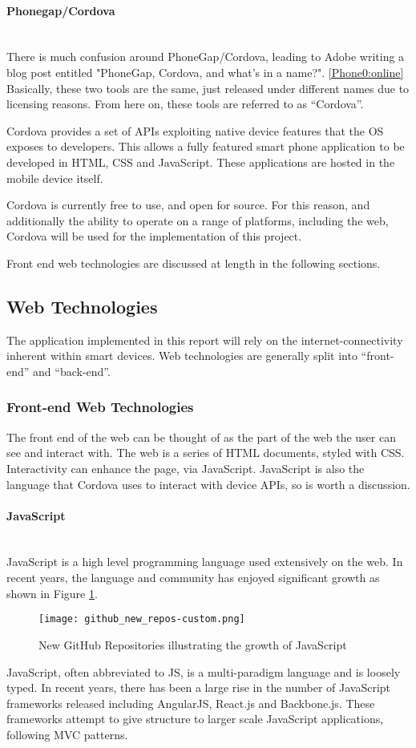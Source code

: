 \documentclass[a4paper]{article}
\newcommand{\subsubsubsection}[1]{\paragraph{#1}\mbox{}\\}
\begin{document}
\subsubsubsection{Phonegap/Cordova} 
There is much confusion around PhoneGap/Cordova, leading to Adobe writing a blog post entitled "PhoneGap, Cordova, and what’s in a name?". \ref{Phone0:online}
Basically, these two tools are the same, just released under different names due to licensing reasons. From here on, these tools are referred to as ``Cordova''. 

Cordova provides a set of APIs exploiting native device features that the OS exposes to developers.
This allows a fully featured smart phone application to be developed in HTML, CSS and JavaScript. These applications are hosted in the mobile device itself.

Cordova is currently free to use, and open for source. For this reason, and additionally the ability to operate on a range of platforms, including the web, Cordova will be used for the implementation of this project.

Front end web technologies are discussed at length in the following sections.

\subsection{Web Technologies}
The application implemented in this report will rely on the internet-connectivity inherent within smart devices. Web technologies are generally split into ``front-end'' and ``back-end''.

\subsubsection{Front-end Web Technologies}
The front end of the web can be thought of as the part of the web the user can see and interact with. The web is a series of HTML documents, styled with CSS.
Interactivity can enhance the page, via JavaScript. JavaScript is also the language that Cordova uses to interact with device APIs, so is worth a discussion.
\subsubsubsection{JavaScript}
JavaScript is a high level programming language used extensively on the web. In recent years, the language and community has enjoyed significant growth as shown in Figure \ref{fig:githubRepos}.
\begin{figure}[H]
  \centering
    \texttt{[image: github\_new\_repos-custom.png]}
      \caption{New GitHub Repositories illustrating the growth of JavaScript}
      \label{fig:githubRepos}
\end{figure}

JavaScript, often abbreviated to JS, is a multi-paradigm language and is loosely typed. In recent years, there has been a large rise in the number of JavaScript frameworks released including AngularJS, React.js and Backbone.js. These frameworks attempt to give structure to larger scale JavaScript applications, following MVC patterns. 
\end{document}
